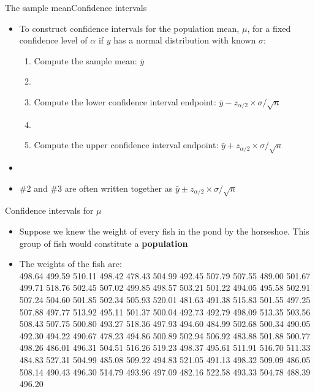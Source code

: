 \documentclass[xcolor=dvipsnames]{beamer}
\begin{document}
\begin{frame}{The sample mean}{Confidence intervals}
	\begin{itemize}
		\item To construct confidence intervals for the population mean, $\mu$, for a fixed confidence level of $\alpha$ if $y$ has a normal distribution with known $\sigma$: \pause 
		\begin{enumerate}
			\item Compute the sample mean: $\bar{y}$ \pause 
			\item[]
			\item Compute the lower confidence interval endpoint: $\bar{y} - z_{\alpha / 2} \times \sigma / \sqrt{n}$ \pause 
			\item[]
			\item Compute the upper confidence interval endpoint: $\bar{y} + z_{\alpha / 2} \times \sigma / \sqrt{n}$
		\end{enumerate}
	\item[]
	\item \#2 and \#3 are often written together as $\bar{y} \pm z_{\alpha / 2} \times \sigma / \sqrt{n}$
	\end{itemize}
\end{frame}

\begin{frame}{Confidence intervals for $\mu$}
		\begin{itemize}
			\item Suppose we knew the weight of every fish in the pond by the horseshoe. This group of fish would constitute a \textbf{population} \pause 
			\item The weights of the fish are: \\
			498.64 499.59 510.11 498.42 478.43 504.99 492.45 507.79 507.55 489.00 501.67 499.71 518.76 502.45 507.02 499.85
			498.57 503.21 501.22 494.05 495.58 502.91 507.24 504.60 501.85 502.34 505.93 520.01 481.63 491.38 515.83 501.55
			497.25 507.88 497.77 513.92 495.11 501.37 500.04 492.73 492.79 498.09 513.35 503.56 508.43 507.75 500.80 493.27
			518.36 497.93 494.60 484.99 502.68 500.34 490.05 492.30 494.22 490.67 478.23 494.86 500.89 502.94 506.92 483.88
			501.88 500.77 498.26 486.01 496.31 504.51 516.26 519.23 498.37 495.61 511.91 516.70 511.33 484.83 527.31 504.99
			485.08 509.22 494.83 521.05 491.13 498.32 509.09 486.05 508.14 490.43 496.30 514.79 493.96 497.09 482.16 522.58
			493.33 504.78 488.39 496.20
		\end{itemize}
\end{frame}
\end{document}
